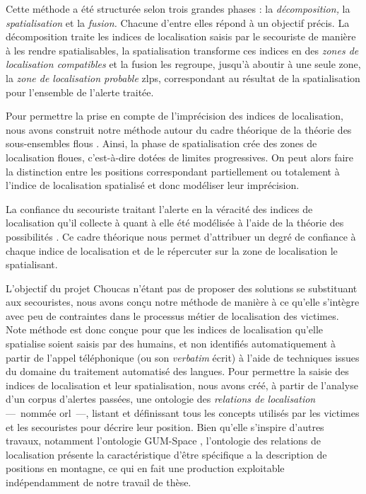 Cette méthode a été structurée selon trois grandes phases : la
\emph{décomposition,} la \emph{spatialisation} et la \emph{fusion.}
Chacune d'entre elles répond à un objectif précis. La décomposition
traite les indices de localisation saisis par le secouriste de manière
à les rendre spatialisables, la spatialisation transforme ces indices
en des \emph{zones de localisation compatibles} et la fusion les
regroupe, jusqu'à aboutir à une seule zone, la \emph{zone de
  localisation probable} \acp{zlp}, correspondant au résultat de la
spatialisation pour l'ensemble de l'alerte traitée.

Pour permettre la prise en compte de l'imprécision des indices de
localisation, nous avons construit notre méthode autour du cadre
théorique de la théorie des sous-ensembles flous
\autocite{Zadeh1965}. Ainsi, la phase de spatialisation crée des zones
de localisation floues, c'est-à-dire dotées de limites
progressives. On peut alors faire la distinction entre les positions
correspondant partiellement ou totalement à l'indice de localisation
spatialisé et donc modéliser leur imprécision. 

La confiance du secouriste traitant l'alerte en la véracité des
indices de localisation qu'il collecte à quant à elle été modélisée à
l'aide de la théorie des possibilités \autocite{Zadeh1978}. Ce cadre
théorique nous permet d'attribuer un degré de confiance à chaque
indice de localisation et de le répercuter sur la zone de localisation
le spatialisant.

L'objectif du projet Choucas n'étant pas de proposer des solutions se
substituant aux secouristes, nous avons conçu notre méthode de manière
à ce qu'elle s'intègre avec peu de contraintes dans le processus
métier de localisation des victimes. Note méthode est donc conçue pour
que les indices de localisation qu'elle spatialise soient saisis par
des humains, et non identifiés automatiquement à partir de l'appel
téléphonique (ou son \emph{verbatim} écrit) à l'aide de techniques
issues du domaine du traitement automatisé des langues. Pour permettre
la saisie des indices de localisation et leur spatialisation, nous
avons créé, à partir de l'analyse d'un corpus d'alertes passées, une
ontologie des \emph{relations de localisation} ---~nommée
\ac{orl}~---, listant et définissant tous les concepts utilisés par
les victimes et les secouristes pour décrire leur position. Bien
qu'elle s'inspire d'autres travaux, notamment l'ontologie GUM-Space
\autocite{Bateman2010}, l'ontologie des relations de localisation
présente la caractéristique d'être spécifique a la description de
positions en montagne, ce qui en fait une production exploitable
indépendamment de notre travail de thèse.

